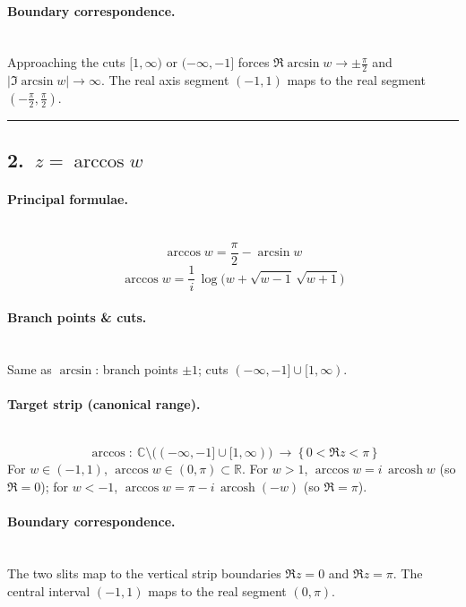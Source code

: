 \documentclass[11pt]{article}
\newcommand{\BoxEq}[1]{\begin{equation*}\boxed{\displaystyle #1}\end{equation*}}
\begin{document}
\paragraph{Boundary correspondence.}\mbox{}\\[2pt]
Approaching the cuts $[1,\infty)$ or $(-\infty,-1]$ forces $\Re \arcsin w\to \pm\tfrac{\pi}{2}$ and $|\Im \arcsin w|\to\infty$.
The real axis segment $(-1,1)$ maps to the real segment $(-\tfrac{\pi}{2},\tfrac{\pi}{2})$.

\bigskip\hrule\bigskip

\subsection*{2.\ $z=\arccos w$}

\paragraph{Principal formulae.}\mbox{}\\[2pt]
\BoxEq{ \arccos w = \frac{\pi}{2}-\arcsin w }
\BoxEq{ \arccos w = \frac{1}{i}\,\log\!\Big(w+\sqrt{w-1}\,\sqrt{w+1}\Big) }

\paragraph{Branch points \& cuts.}\mbox{}\\[2pt]
Same as $\arcsin$: branch points $\pm1$; cuts $(-\infty,-1]\cup[1,\infty)$.

\paragraph{Target strip (canonical range).}\mbox{}\\[2pt]
\BoxEq{ \arccos:\ \mathbb C\setminus\big((-\infty,-1]\cup[1,\infty)\big)\ \longrightarrow\ \{\,0<\Re z<\pi\,\} }
For $w\in(-1,1)$, $\arccos w\in(0,\pi)\subset\mathbb R$.
For $w>1$, $\arccos w=i\,\operatorname{arcosh} w$ (so $\Re=0$);
for $w<-1$, $\arccos w=\pi - i\,\operatorname{arcosh}(-w)$ (so $\Re=\pi$).

\paragraph{Boundary correspondence.}\mbox{}\\[2pt]
The two slits map to the vertical strip boundaries $\Re z=0$ and $\Re z=\pi$.
The central interval $(-1,1)$ maps to the real segment $(0,\pi)$.
\end{document}
